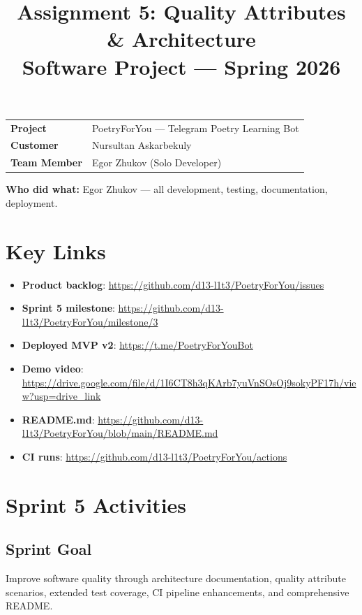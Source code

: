 \documentclass[11pt, a4paper]{article}
\title{\textbf{Assignment 5: Quality Attributes \& Architecture}\\[0.5em]
\large Software Project --- Spring 2026}
\author{}
\date{}
\begin{document}
\maketitle
\thispagestyle{empty}

\begin{center}
\begin{tabular}{ll}
\toprule
\textbf{Project} & PoetryForYou --- Telegram Poetry Learning Bot \\
\textbf{Customer} & Nursultan Askarbekuly \\
\textbf{Team Member} & Egor Zhukov (Solo Developer) \\
\bottomrule
\end{tabular}
\end{center}

\textbf{Who did what:} Egor Zhukov --- all development, testing, documentation, deployment.

\section*{Key Links}

\begin{itemize}
    \item \textbf{Product backlog}: \url{https://github.com/d13-l1t3/PoetryForYou/issues}
    \item \textbf{Sprint 5 milestone}: \url{https://github.com/d13-l1t3/PoetryForYou/milestone/3}
    \item \textbf{Deployed MVP v2}: \url{https://t.me/PoetryForYouBot}
    \item \textbf{Demo video}: \url{https://drive.google.com/file/d/1I6CT8h3qKArb7yuVnSOsOj9sokyPF17h/view?usp=drive_link}
    \item \textbf{README.md}: \url{https://github.com/d13-l1t3/PoetryForYou/blob/main/README.md}
    \item \textbf{CI runs}: \url{https://github.com/d13-l1t3/PoetryForYou/actions}
\end{itemize}

\section{Sprint 5 Activities}

\subsection*{Sprint Goal}
Improve software quality through architecture documentation, quality attribute scenarios, extended test coverage, CI pipeline enhancements, and comprehensive README.
\end{document}
